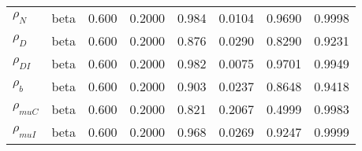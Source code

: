 \begin{center}
\begin{longtable}{llcccccc}
${\rho_N}$ & beta &   0.600 & 0.2000 &   0.984& 0.0104 &  0.9690 &  0.9998 \\ 
${\rho_D}$ & beta &   0.600 & 0.2000 &   0.876& 0.0290 &  0.8290 &  0.9231 \\ 
${\rho_{DI}}$ & beta &   0.600 & 0.2000 &   0.982& 0.0075 &  0.9701 &  0.9949 \\ 
${\rho_b}$ & beta &   0.600 & 0.2000 &   0.903& 0.0237 &  0.8648 &  0.9418 \\ 
${\rho_{muC}}$ & beta &   0.600 & 0.2000 &   0.821& 0.2067 &  0.4999 &  0.9983 \\ 
${\rho_{muI}}$ & beta &   0.600 & 0.2000 &   0.968& 0.0269 &  0.9247 &  0.9999 \\ 
\end{longtable}
 \end{center}
